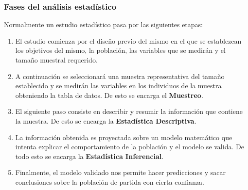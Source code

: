 \begin{frame}
\frametitle{Fases del análisis estadístico}
Normalmente un estudio estadístico pasa por las siguientes etapas:
\begin{enumerate}
\item El estudio comienza por el diseño previo del mismo en el que se establezcan los objetivos del mismo, la población, las variables que se medirán y el tamaño muestral requerido.
\item A continuación se seleccionará una muestra representativa del tamaño establecido y se medirán las variables en los individuos de la muestra obteniendo la tabla de datos.
De esto se encarga el \textbf{Muestreo}.
\item El siguiente paso consiste en describir y resumir la información que contiene la muestra.
De esto se encarga la \textbf{Estadística Descriptiva}.
\item La información obtenida es proyectada sobre un modelo matemático que intenta explicar el comportamiento de la población y el modelo se valida.
De todo esto se encarga la \textbf{Estadística Inferencial}.
\item Finalmente, el modelo validado nos permite hacer predicciones y sacar conclusiones sobre la población de partida con cierta confianza.
\end{enumerate}
\end{frame}



